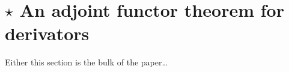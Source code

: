 \section{$\star$ An adjoint functor theorem for derivators}
Either this section is the bulk of the paper\dots
